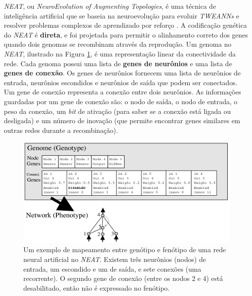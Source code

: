 \textit{NEAT}, ou \textit{NeuroEvolution of Augmenting Topologies}, é uma
técnica de inteligência artificial que se baseia na neuroevolução para evoluir
\textit{TWEANNs} e resolver problemas complexos de aprendizado por reforço
\cite{stanley:ec02}. A codificação genética do \textit{NEAT} é \textbf{direta},
e foi projetada para permitir o alinhamento correto dos genes quando dois
genomas se recombinam através da reprodução. Um genoma no \textit{NEAT},
ilustrado na Figura \ref{fig:neat-encoding-example}, é uma representação linear
da conectividade da rede. Cada genoma possui uma lista de \textbf{genes de
neurônios} e uma lista de \textbf{genes de conexão}. Os genes de neurônios
fornecem uma lista de neurônios de entrada, neurônios escondidos e neurônios de
saída que podem ser conectados.  Um gene de conexão representa a conexão entre
dois neurônios. As informações guardadas por um gene de conexão são: o nodo de
saída, o nodo de entrada, o peso da conexão, um \textit{bit} de ativação (para
saber se a conexão está ligada ou desligada) e um número de inovação (que
permite encontrar genes similares em outras redes durante a recombinação). 

\begin{figure}[H]
\centering
\includegraphics[width=\textwidth]{fig/neat-encoding-example.pdf}
\caption{Um exemplo de mapeamento entre genótipo e fenótipo de uma rede neural
artificial no \textit{NEAT}. Existem três neurônios (nodos) de entrada, um
escondido e um de saída, e sete conexões (uma recorrente). O segundo gene de
conexão (entre os nodos 2 e 4) está desabilitado, então não é expressado no
fenótipo.}
\label{fig:neat-encoding-example}
\end{figure}



